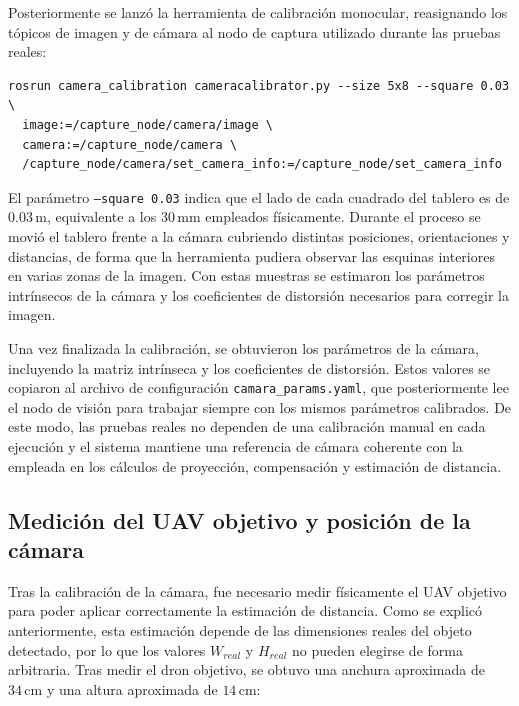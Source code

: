 \vspace{0.3cm}

Posteriormente se lanzó la herramienta de calibración monocular, reasignando los tópicos de imagen y de cámara al nodo de captura utilizado durante las pruebas reales:

\begin{lstlisting}[frame=none, numbers=none, backgroundcolor=\color{white}]
rosrun camera_calibration cameracalibrator.py --size 5x8 --square 0.03 \
  image:=/capture_node/camera/image \
  camera:=/capture_node/camera \
  /capture_node/camera/set_camera_info:=/capture_node/set_camera_info
\end{lstlisting}

\vspace{0.3cm}

El parámetro \texttt{--square 0.03} indica que el lado de cada cuadrado del tablero es de $0.03\,\mathrm{m}$, equivalente a los $30\,\mathrm{mm}$ empleados físicamente. Durante el proceso se movió el tablero frente a la cámara cubriendo distintas posiciones, orientaciones y distancias, de forma que la herramienta pudiera observar las esquinas interiores en varias zonas de la imagen. Con estas muestras se estimaron los parámetros intrínsecos de la cámara y los coeficientes de distorsión necesarios para corregir la imagen.

\vspace{0.3cm}

Una vez finalizada la calibración, se obtuvieron los parámetros de la cámara, incluyendo la matriz intrínseca y los coeficientes de distorsión. Estos valores se copiaron al archivo de configuración \texttt{camara\_params.yaml}, que posteriormente lee el nodo de visión para trabajar siempre con los mismos parámetros calibrados. De este modo, las pruebas reales no dependen de una calibración manual en cada ejecución y el sistema mantiene una referencia de cámara coherente con la empleada en los cálculos de proyección, compensación y estimación de distancia.


\vspace{0.3cm}

\subsection{Medición del UAV objetivo y posición de la cámara}

Tras la calibración de la cámara, fue necesario medir físicamente el UAV objetivo para poder aplicar correctamente la estimación de distancia. Como se explicó anteriormente, esta estimación depende de las dimensiones reales del objeto detectado, por lo que los valores $W_{real}$ y $H_{real}$ no pueden elegirse de forma arbitraria. Tras medir el dron objetivo, se obtuvo una anchura aproximada de $34\,\mathrm{cm}$ y una altura aproximada de $14\,\mathrm{cm}$:

